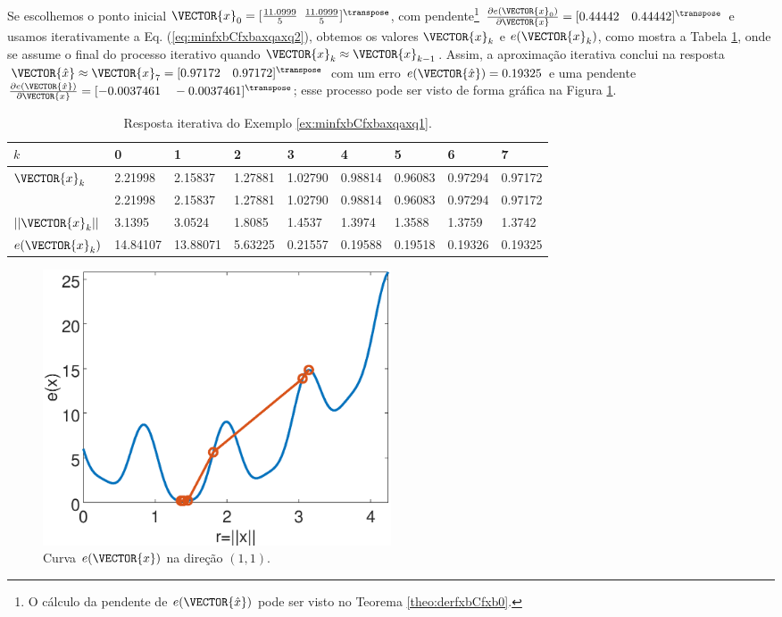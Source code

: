 \begin{SolutionT}
\label{ex:minfxbCfxbaxqaxq3:sol2}
Se escolhemos o ponto inicial $\VECTOR{x}_0=[\frac{11.0999}{5}$ $\frac{11.0999}{5}]^{\transpose}$,
com pendente\footnote{O cálculo da
pendente de $e(\VECTOR{\hat{x}})$ pode ser visto no Teorema \ref{theo:derfxbCfxb0}.} 
$\frac{\partial e(\VECTOR{x}_0)}{\partial \VECTOR{x} }=[0.44442\quad 0.44442]^{\transpose}$ e 
usamos iterativamente a Eq. (\ref{eq:minfxbCfxbaxqaxq2}), obtemos os valores 
$\VECTOR{x}_k$ e $e(\VECTOR{x}_k)$, como mostra a Tabela \ref{table:ex:minfxbCfxbaxqaxq4},
onde se assume o final do processo iterativo quando $\VECTOR{x}_k \approx \VECTOR{x}_{k-1}$.
Assim, a aproximação iterativa conclui na resposta 
$\VECTOR{\hat{x}}\approx \VECTOR{x}_{7} =[0.97172\quad 0.97172]^{\transpose}$
com um erro $e(\VECTOR{\hat{x}})=0.19325$ e uma pendente
$\frac{\partial e(\VECTOR{\hat{x}})}{\partial \VECTOR{x} }=[-0.0037461\quad -0.0037461]^{\transpose}$;
esse processo pode ser visto de forma gráfica na Figura \ref{fig:ex:minfxbCfxbaxqaxq4:b}.
\end{SolutionT}


\begin{table}[h!]
\centering
\begin{tabular}{|l|l|l|l|l|l|l|l|l|}
\hline
$k$ & 0 & 1 & 2 & 3 & 4 & 5 & 6 & 7\\ \hline
$\VECTOR{x}_k$ & 2.21998 & 2.15837 & 1.27881 & 1.02790 & 0.98814 & 0.96083 & 0.97294 & 0.97172 \\ 
~              & 2.21998 & 2.15837 & 1.27881 & 1.02790 & 0.98814 & 0.96083 & 0.97294 & 0.97172 \\ \hline
$||\VECTOR{x}_k||$ & 3.1395 & 3.0524 & 1.8085 & 1.4537 & 1.3974 & 1.3588 & 1.3759 & 1.3742 \\ \hline
$e(\VECTOR{x}_k)$ & 14.84107 & 13.88071 & 5.63225 & 0.21557 & 0.19588 & 0.19518 & 0.19326 & 0.19325 \\ \hline
\end{tabular}
\caption{Resposta iterativa do Exemplo \ref{ex:minfxbCfxbaxqaxq1}.}
\label{table:ex:minfxbCfxbaxqaxq4}
\end{table}

     \begin{figure}[!h]
         \centering
         \includegraphics[width=0.5\textwidth]{chapters/minimization-fx/mfiles/fxxq3/plotfx4.eps}
         \caption{Curva $e(\VECTOR{x})$ na direção $(1,1)$.}
         \label{fig:ex:minfxbCfxbaxqaxq4:b}
     \end{figure}



